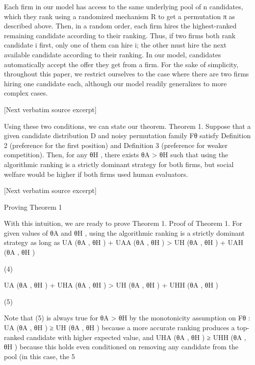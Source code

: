 \documentclass[10pt]{article}
\begin{document}
\begin{ReviewVerbatim}
Each firm in our model has access to the same underlying pool of n candidates, which they rank using
a randomized mechanism R to get a permutation π as described above. Then, in a random order, each
firm hires the highest-ranked remaining candidate according to their ranking. Thus, if two firms both rank
candidate i first, only one of them can hire i; the other must hire the next available candidate according to
their ranking. In our model, candidates automatically accept the offer they get from a firm. For the sake
of simplicity, throughout this paper, we restrict ourselves to the case where there are two firms hiring one
candidate each, although our model readily generalizes to more complex cases.

[Next verbatim source excerpt]

Using these two conditions, we can state our theorem.
Theorem 1. Suppose that a given candidate distribution D and noisy permutation family Fθ satisfy Definition 2 (preference for the first position) and Definition 3 (preference for weaker competition).
Then, for any θH , there exists θA > θH such that using the algorithmic ranking is a strictly dominant
strategy for both firms, but social welfare would be higher if both firms used human evaluators.

[Next verbatim source excerpt]

Proving Theorem 1

With this intuition, we are ready to prove Theorem 1.
Proof of Theorem 1. For given values of θA and θH , using the algorithmic ranking is a strictly dominant
strategy as long as
UA (θA , θH ) + UAA (θA , θH ) > UH (θA , θH ) + UAH (θA , θH )

(4)

UA (θA , θH ) + UHA (θA , θH ) > UH (θA , θH ) + UHH (θA , θH )

(5)

Note that (5) is always true for θA > θH by the monotonicity assumption on Fθ : UA (θA , θH ) ≥ UH (θA , θH )
because a more accurate ranking produces a top-ranked candidate with higher expected value, and UHA (θA , θH ) ≥
UHH (θA , θH ) because this holds even conditioned on removing any candidate from the pool (in this case, the
5



\end{ReviewVerbatim}
\end{document}
